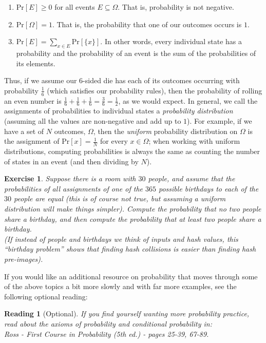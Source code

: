 \documentclass[12pt]{article}
\newcommand{\pr}[1]{\text{Pr}\left[#1\right]}
\newtheorem{exercise}{Exercise}
\newtheorem{reading}{Reading}
\theoremstyle{definition}
\theoremstyle{remark}
\theoremstyle{definition}
\begin{document}
\begin{enumerate}
\item $\pr{E}\geq 0$ for all events $E\subseteq \Omega$. That is, probability is not negative.
\item $\pr{\Omega} = 1$. That is, the probability that one of our outcomes occurs is $1$.
\item $\pr{E} = \sum_{x\in E}\pr{\{x\}}$. In other words, every individual state has a probability and the probability of an event is the sum of the probabilities of its elements.
\end{enumerate}

Thus, if we assume our $6$-sided die has each of its outcomes occurring with probability $\frac{1}{6}$ (which satisfies our probability rules), then the probability of rolling an even number is $\frac{1}{6} + \frac{1}{6} + \frac{1}{6} = \frac{3}{6} = \frac{1}{2}$, as we would expect. In general, we call the assignments of probabilities to individual states a \emph{probability distribution} (assuming all the values are non-negative and add up to $1$). For example, if we have a set of $N$ outcomes, $\Omega$, then the \emph{uniform} probability distribution on $\Omega$ is the assignment of $\pr{x} = \frac{1}{N}$ for every $x\in\Omega$; when working with uniform distributions, computing probabilities is always the same as counting the number of states in an event (and then dividing by $N$).

\begin{exercise}
Suppose there is a room with $30$ people, and assume that the probabilities of all assignments of one of the $365$ possible birthdays to each of the $30$ people are equal (this is of course not true, but assuming a uniform distribution will make things simpler). Compute the probability that no two people share a birthday, and then compute the probability that at least two people share a birthday.\\
(If instead of people and birthdays we think of inputs and hash values, this ``birthday problem'' shows that finding hash collisions is easier than finding hash pre-images).
\end{exercise}

If you would like an additional resource on probability that moves through some of the above topics a bit more slowly and with far more examples, see the following optional reading:

\begin{reading}[Optional]
If you find yourself wanting more probability practice, read about the axioms of probability and conditional probability in:\\
Ross - First Course in Probability (5th ed.) - pages 25-39, 67-89.
\end{reading}
\end{document}
